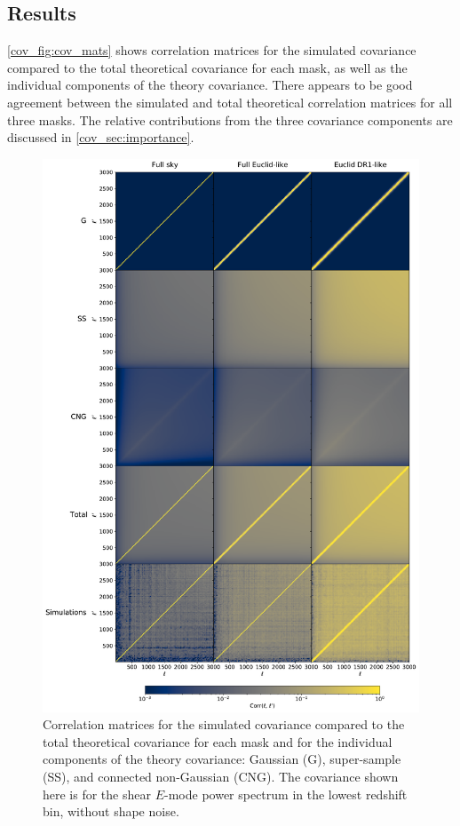 \subsection{Results}
\label{cov_sec:cov_vs_sims}

\autoref{cov_fig:cov_mats} shows correlation matrices for the simulated covariance compared to the total theoretical covariance for each mask, as well as the individual components of the theory covariance. There appears to be good agreement between the simulated and total theoretical correlation matrices for all three masks. The relative contributions from the three covariance components are discussed in \autoref{cov_sec:importance}.

\begin{figure}
\includegraphics[width=.921\textwidth]{cov_mats} %
\caption{Correlation matrices for the simulated covariance compared to the total theoretical covariance for each mask and for the individual components of the theory covariance: Gaussian (G), super-sample (SS), and connected non-Gaussian (CNG). The covariance shown here is for the shear $E$-mode power spectrum in the lowest redshift bin, without shape noise.}
\label{cov_fig:cov_mats}
\end{figure}

